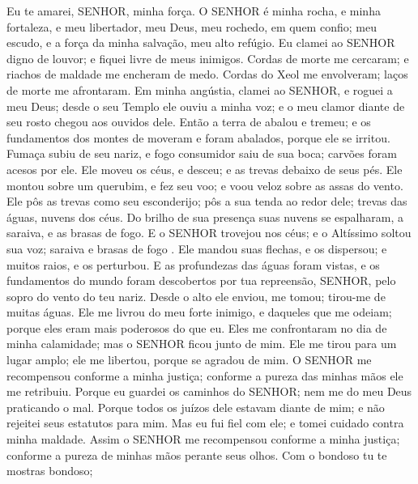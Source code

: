 {\PP 
  Eu te amarei, SENHOR,
{} minha força.
  O SENHOR é minha rocha, e minha fortaleza, e meu libertador, meu Deus, meu rochedo, em quem confio;
{} meu escudo, e a força da minha salvação, meu alto refúgio.
  Eu clamei ao SENHOR digno de louvor; e fiquei livre de meus inimigos.
  Cordas de morte me cercaram; e riachos de maldade me encheram de medo.
  Cordas do Xeol
 me envolveram; laços de morte me afrontaram.
  Em minha angústia, clamei ao SENHOR, e roguei a meu Deus; desde o seu Templo ele ouviu a minha voz; e o meu clamor diante de seu rosto chegou aos ouvidos dele.
  Então a terra de abalou e tremeu; e os fundamentos dos montes de moveram e foram abalados, porque ele se irritou.
  Fumaça subiu de seu nariz, e fogo consumidor saiu de sua boca; carvões foram acesos por ele.
  Ele moveu os céus, e desceu; e as trevas
{} debaixo de seus pés.
  Ele montou sobre um querubim, e fez seu voo; e voou veloz sobre as assas do vento.
  Ele pôs as trevas como seu esconderijo; pôs a sua tenda ao redor dele; trevas das águas, nuvens dos céus.
  Do brilho de sua presença suas nuvens se espalharam,
{} a saraiva, e as brasas de fogo.
  E o SENHOR trovejou nos céus; e o Altíssimo soltou sua voz; saraiva e brasas de fogo
{} .
  Ele mandou suas flechas, e os dispersou; e
{} muitos raios, e os perturbou.
  E as profundezas das águas foram vistas, e os fundamentos do mundo foram descobertos por tua repreensão, SENHOR, pelo sopro do vento do teu nariz.
  Desde o alto ele enviou,
{} me tomou; tirou-me de muitas águas.
  Ele me livrou do meu forte inimigo, e daqueles que me odeiam; porque eles eram mais poderosos do que eu.
  Eles me confrontaram no dia de minha calamidade; mas o SENHOR ficou junto de mim.
  Ele me tirou para um lugar amplo; ele me libertou, porque se agradou de mim.
  O SENHOR me recompensou conforme a minha justiça; conforme a pureza das minhas mãos ele me retribuiu.
  Porque eu guardei os caminhos do SENHOR; nem me
{} do meu Deus praticando o mal.
  Porque todos os juízos dele estavam diante de mim; e não rejeitei seus estatutos para mim.
  Mas eu fui fiel com ele; e tomei cuidado contra minha maldade.
  Assim o SENHOR me recompensou conforme a minha justiça; conforme a pureza de minhas mãos perante seus olhos.
  Com o bondoso tu te mostras bondoso;
}
